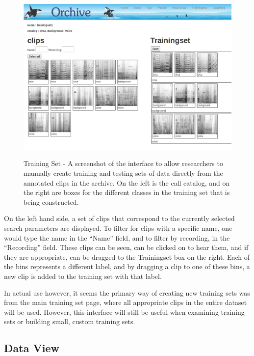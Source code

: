 \begin{figure}[t]
\centering
\includegraphics[width=\columnwidth]{figures/orchiveV2trainingset}
\label{fig:orchiveV2trainingset}
\caption{Training Set - A screenshot of the interface to allow
  researchers to manually create training and testing sets of data
  directly from the annotated clips in the archive.  On the left is
  the call catalog, and on the right are boxes for the different
  classes in the training set that is being constructed.}
\end{figure}



On the left hand side, a set of clips that correspond to the currently
selected search parameters are displayed.  To filter for clips with a
specific name, one would type the name in the ``Name'' field, and to
filter by recording, in the ``Recording'' field.  These clips can be
seen, can be clicked on to hear them, and if they are appropriate, can be
dragged to the Trainingset box on the right.  Each of the bins
represents a different label, and by dragging a clip to one of these
bins, a new clip is added to the training set with that label.

In actual use however, it seems the primary way of creating new
training sets was from the main training set page, where all
appropriate clips in the entire dataset will be used.  However, this
interface will still be useful when examining training sets or
building small, custom training sets.


\subsection{Data View}

